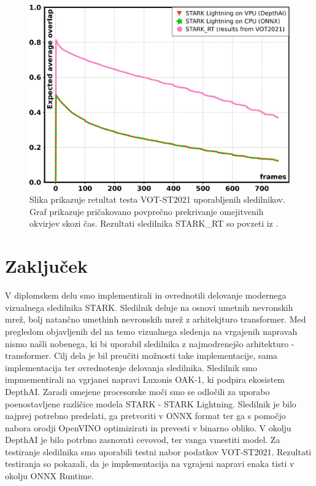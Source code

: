 \documentclass[a4paper,12pt,openright]{book}
\begin{document}
\begin{figure}[htb]
    \begin{center}
        \includegraphics[width=1\textwidth]{img/vot_frames.pdf}
    \end{center}
    \caption{Slika prikazuje retultat testa VOT-ST2021 uporabljenih sledilnikov. Graf prikazuje pričakovano povprečno prekrivanje omejitvenih okvirjev skozi čas. Rezultati sledilnika STARK\_RT so povzeti iz \cite{vot2021}.}
    \label{img:vot_frames}
\end{figure}

\chapter{Zaključek}
V diplomskem delu smo implementirali in ovrednotili delovanje modernega vizualnega sledilnika STARK. Sledilnik deluje na osnovi umetnih nevronskih mrež, bolj natančno umethinh nevronskih mrež z arhitekjturo transformer. Med pregledom objavljenih del na temo vizualnega sledenja na vrgajenih napravah nismo našli nobenega, ki bi uporabil sledilnika z najmodrenejšo arhitekturo - transformer. Cilj dela je bil preučiti možnosti take implementacije, sama implementacija ter ovrednotenje delovanja sledilnika. Sledilnik smo impmementirali na vgrjanei napravi Luxonis OAK-1, ki podpira ekosistem DepthAI. Zaradi omejene procesorske moči smo se odločili za uporabo poenostavljene različice modela STARK - STARK Lightning. Sledilnik je bilo najprej potrebno predelati, ga pretvoriti v ONNX format ter ga s pomočjo nabora orodji OpenVINO optimizirati in prevesti v binarno obliko. V okolju DepthAI je bilo potrbno zasnovati cevovod, ter vanga vmestiti model. Za testiranje sledilnika smo uporabili testni nabor podatkov VOT-ST2021. Rezultati testiranja so pokazali, da je implementacija na vgrajeni napravi enaka tisti v okolju ONNX Runtime.
\end{document}
